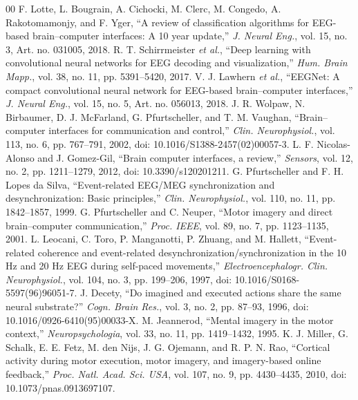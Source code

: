 \documentclass[preprint,12pt]{elsarticle}
\begin{document}
\begin{thebibliography}{00}
 F. Lotte, L. Bougrain, A. Cichocki, M. Clerc, M. Congedo, A. Rakotomamonjy, and F. Yger, ``A review of classification algorithms for EEG-based brain--computer interfaces: A 10 year update,'' \emph{J. Neural Eng.}, vol. 15, no. 3, Art. no. 031005, 2018.
 R. T. Schirrmeister \emph{et al.}, ``Deep learning with convolutional neural networks for EEG decoding and visualization,'' \emph{Hum. Brain Mapp.}, vol. 38, no. 11, pp. 5391--5420, 2017.
 V. J. Lawhern \emph{et al.}, ``EEGNet: A compact convolutional neural network for EEG-based brain--computer interfaces,'' \emph{J. Neural Eng.}, vol. 15, no. 5, Art. no. 056013, 2018.
 J. R. Wolpaw, N. Birbaumer, D. J. McFarland, G. Pfurtscheller, and T. M. Vaughan, ``Brain--computer interfaces for communication and control,'' \emph{Clin. Neurophysiol.}, vol. 113, no. 6, pp. 767--791, 2002, doi: 10.1016/S1388-2457(02)00057-3.
 L. F. Nicolas-Alonso and J. Gomez-Gil, ``Brain computer interfaces, a review,'' \emph{Sensors}, vol. 12, no. 2, pp. 1211--1279, 2012, doi: 10.3390/s120201211.
 G. Pfurtscheller and F. H. Lopes da Silva, ``Event-related EEG/MEG synchronization and desynchronization: Basic principles,'' \emph{Clin. Neurophysiol.}, vol. 110, no. 11, pp. 1842--1857, 1999.
 G. Pfurtscheller and C. Neuper, ``Motor imagery and direct brain--computer communication,'' \emph{Proc. IEEE}, vol. 89, no. 7, pp. 1123--1135, 2001.
 L. Leocani, C. Toro, P. Manganotti, P. Zhuang, and M. Hallett, ``Event-related coherence and event-related desynchronization/synchronization in the 10 Hz and 20 Hz EEG during self-paced movements,'' \emph{Electroencephalogr. Clin. Neurophysiol.}, vol. 104, no. 3, pp. 199--206, 1997, doi: 10.1016/S0168-5597(96)96051-7.
 J. Decety, ``Do imagined and executed actions share the same neural substrate?'' \emph{Cogn. Brain Res.}, vol. 3, no. 2, pp. 87--93, 1996, doi: 10.1016/0926-6410(95)00033-X.
 M. Jeannerod, ``Mental imagery in the motor context,'' \emph{Neuropsychologia}, vol. 33, no. 11, pp. 1419--1432, 1995.
 K. J. Miller, G. Schalk, E. E. Fetz, M. den Nijs, J. G. Ojemann, and R. P. N. Rao, ``Cortical activity during motor execution, motor imagery, and imagery-based online feedback,'' \emph{Proc. Natl. Acad. Sci. USA}, vol. 107, no. 9, pp. 4430--4435, 2010, doi: 10.1073/pnas.0913697107.

\end{thebibliography}
\end{document}
